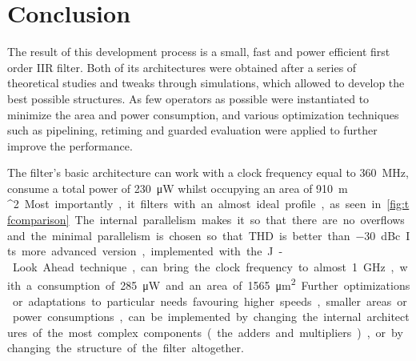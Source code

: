 \chapter{Conclusion}
The result of this development process is a small, fast and power efficient first order IIR filter. Both of its architectures were obtained after a series of theoretical studies and tweaks through simulations, which allowed to develop the best possible structures. As few operators as possible were instantiated to minimize the area and power consumption, and various optimization techniques such as pipelining, retiming and guarded evaluation were applied to further improve the performance.

The filter's basic architecture can work with a clock frequency equal to \SI{360}{MHz}, consume a total power of \SI{230}{\micro W} whilst occupying an area of \SI{910}{\micro m ^2}. Most importantly, it filters with an almost ideal profile, as seen in \autoref{fig:tfcomparison}. The internal parallelism makes it so that there are no overflows and the minimal parallelism is chosen so that THD is better than \SI{-30}{dBc}.

Its more advanced version, implemented with the J-Look Ahead technique, can bring the clock frequency to almost \SI{1}{GHz}, with a consumption of \SI{285}{\micro W} and an area of \SI{1565}{\micro m^2}.

Further optimizations or adaptations to particular needs favouring higher speeds, smaller areas or power consumptions, can be implemented by changing the internal architectures of the most complex components (the adders and multipliers), or by changing the structure of the filter altogether. 
